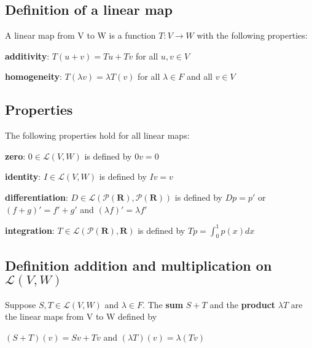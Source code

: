\documentclass{article}
\begin{document}
\subsection{Definition of a linear map}
    
A linear map from V to W is a function $T: V \to W$ with the following properties:

\parindent=24pt
    \textbf{additivity}: \hspace{30pt}$T(u+v)=Tu + Tv$ for all $u,v \in V$
    
    \textbf{homogeneity}: \hspace{15pt}$T(\lambda v) = \lambda T(v)$ for all $\lambda \in F$ and all $v \in V$

\newpage

\subsection{Properties}
The following properties hold for all linear maps:

    \textbf{zero}: \hspace{70pt}$0 \in \mathcal{L}(V,W)$ is defined by $0v=0$
    
    \textbf{identity}: \hspace{52pt}$I \in \mathcal{L}(V,W)$ is defined by $Iv=v$
    
    \textbf{differentiation}: \hspace{15pt} $D \in \mathcal{L}(\mathcal{P}(\mathbf{R}),\mathcal{P}(\mathbf{R}))$ is defined by \hspace{2pt} $Dp = p'$ \hspace{2pt} or \hspace{2pt}$(f+g)' = f'+g'$ and $(\lambda f)'=\lambda f'$
    
    \textbf{integration}: \hspace{36pt}$T \in \mathcal{L}(\mathcal{P}(\mathbf{R}),\mathbf{R})$ is defined by $Tp = \int_0^1 p(x)dx$


\subsection{Definition addition and multiplication on $\mathcal{L}(V,W)$}

    Suppose $S,T \in \mathcal{L}(V,W)$ and $\lambda \in F$. The \textbf{sum} $S + T$ and the \textbf{product} $\lambda T$ are the linear maps from V to W defined by
    \vspace{4pt}
    
    \centerline{$(S+T)(v) = Sv + Tv$ and $(\lambda T)(v) = \lambda (Tv)$}
    
\end{document}
